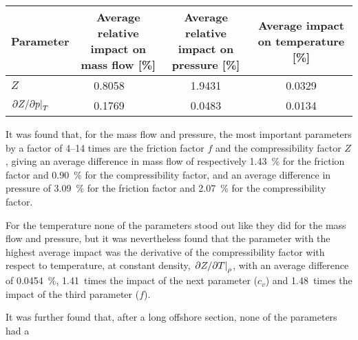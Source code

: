\begin{table}[!hb]
    \caption{
    }
    \centering
    \begin{tabular}{lclcc}
        \toprule
        Parameter & \multicolumn{2}{c}{\parbox{4cm}{\centering Average relative impact on mass flow [\si{\percent}]}} & \parbox{4cm}{\centering Average relative impact on pressure [\si{\percent}]} & \parbox{4cm}{\centering Average impact on temperature [\si{\percent}]} \\
        \midrule
        $Z$ & 0.8058 & \colorbox{green}{\hspace{0.8058cm}} & 1.9431 & 0.0329 \\
        $\eval{\partial Z/\partial p}_T$ & 0.1769 & \colorbox{green}{\hspace{0.1769cm}} & 0.0483 & 0.0134 \\
        \bottomrule
    \end{tabular}
\end{table}

It was found that, for the mass flow and pressure, the most important parameters by a factor of 4--14 times are the friction factor $f$ and the compressibility factor $Z$, giving an average difference in mass flow of respectively \SI{1.43}{\percent} for the friction factor and \SI{0.90}{\percent} for the compressibility factor, and an average difference in pressure of \SI{3.09}{\percent} for the friction factor and \SI{2.07}{\percent} for the compressibility factor.

For the temperature none of the parameters stood out like they did for the mass flow and pressure, but it was nevertheless found that the parameter with the highest average impact was the derivative of the compressibility factor with respect to temperature, at constant density, $\eval{\partial Z/\partial T}_\rho$, with an average difference of \SI{0.0454}{\percent}, 1.41~times the impact of the next parameter ($c_v$) and 1.48~times the impact of the third parameter ($f$).

It was further found that, after a long offshore section, none of the parameters had a 

